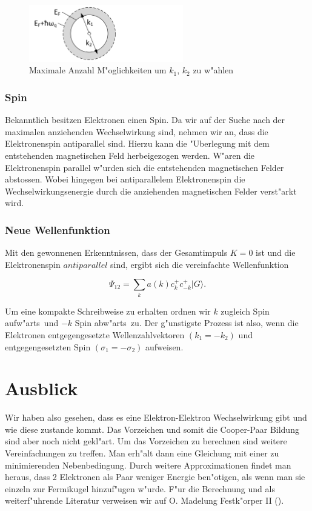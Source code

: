 \begin{refsection}
\begin{figure}	
\centering
\includegraphics[width=0.6\textwidth]{supraleitung/kGraphic_09.png} %
\caption{Maximale Anzahl M"oglichkeiten um $k_1$, $k_2$ zu w"ahlen
\label{supraleitung:kRaum_09}}
\end{figure}

\subsubsection{Spin}
Bekanntlich besitzen Elektronen einen Spin. Da wir auf der Suche nach der maximalen anziehenden Wechselwirkung sind, nehmen wir an, dass die Elektronenspin antiparallel sind. Hierzu kann die "Uberlegung mit dem entstehenden magnetischen Feld herbeigezogen werden. W"aren die Elektronenspin parallel w"urden sich die entstehenden magnetischen Felder abstossen. Wobei hingegen bei antiparallelem Elektronenspin die Wechselwirkungsenergie durch die anziehenden magnetischen Felder verst"arkt wird.

\subsubsection{Neue Wellenfunktion}
Mit den gewonnenen Erkenntnissen, dass der Gesamtimpuls $K=0$ ist und die Elektronenspin $antiparallel$ sind, ergibt sich die vereinfachte Wellenfunktion

\[
\Psi_{12}=\sum \limits_{k} a(k)c^+_{k}c^+_{-k}|G\rangle.
\]

Um eine kompakte Schreibweise zu erhalten ordnen wir $k$ zugleich \glqq Spin aufw"arts\grqq~und $-k$ \glqq Spin abw"arts\grqq~zu.
Der g"unstigste Prozess ist also, wenn die Elektronen entgegengesetzte Wellenzahlvektoren $(k_1 = -k_2)$ und entgegengesetzten Spin $(\sigma_1 = -\sigma_2)$ aufweisen.

\section{Ausblick}
Wir haben also gesehen, dass es eine Elektron-Elektron Wechselwirkung gibt und wie diese zustande kommt. Das Vorzeichen und somit die Cooper-Paar Bildung sind aber noch nicht gekl"art. Um das Vorzeichen zu berechnen sind weitere Vereinfachungen zu treffen. Man erh"alt dann eine Gleichung mit einer zu minimierenden Nebenbedingung. Durch weitere Approximationen findet man heraus, dass 2 Elektronen als Paar weniger Energie ben"otigen, als wenn man sie einzeln zur Fermikugel hinzuf"ugen w"urde. F"ur die Berechnung und als weiterf"uhrende Literatur verweisen wir auf O. Madelung Festk"orper II (\cite{skript:madelung1}).


\printbibliography[heading=subbibliography]
\end{refsection}



